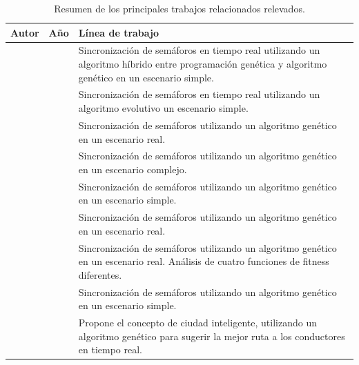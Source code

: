 \begin{table}[ht]
	\renewcommand{\arraystretch}{1.2}
	\caption{Resumen de los principales trabajos relacionados relevados.}
	\label{table:resumen_trabajos}
	\centering
	\begin{tabular}{p{3cm}p{1cm}p{9cm}}
		\hline
		Autor& 
	    Año & 
		Línea de trabajo\\ 
		\hline
		\citeauthor{Montana1996} & \citeyear{Montana1996}   &  Sincronización de semáforos en tiempo real utilizando un algoritmo híbrido entre programación genética y  algoritmo genético en un escenario simple. \\
		\citeauthor{Vogel2000} & \citeyear{Vogel2000}       &  Sincronización de semáforos en tiempo real utilizando un algoritmo evolutivo un escenario simple.\\
		\citeauthor{Rouphail2000} & \citeyear{Rouphail2000} &  Sincronización de semáforos utilizando un algoritmo genético en un escenario real.\\			
		\citeauthor{Penner2002} & \citeyear{Penner2002}     &  Sincronización de semáforos utilizando un algoritmo genético en un escenario complejo.\\	
	    \citeauthor{Sanchez2004} & \citeyear{Sanchez2004}   &  Sincronización de semáforos utilizando un algoritmo genético en un escenario simple.\\
		\citeauthor{Sanchez2008} & \citeyear{Sanchez2008}   &  Sincronización de semáforos utilizando un algoritmo genético en un escenario real.\\
		\citeauthor{Sanchez2010} & \citeyear{Sanchez2010}   &  Sincronización de semáforos utilizando un algoritmo genético en un escenario real. Análisis de cuatro funciones de fitness diferentes.\\
		\citeauthor{Teo2010} & \citeyear{Teo2010}           &  Sincronización de semáforos utilizando un algoritmo genético en un escenario simple.\\
		\citeauthor{Stolfi2012} & \citeyear{Stolfi2012}     &  Propone el concepto de ciudad inteligente, utilizando un algoritmo genético para sugerir la mejor ruta a los conductores en tiempo real.\\


			
		\hline
	\end{tabular}
\end{table}







